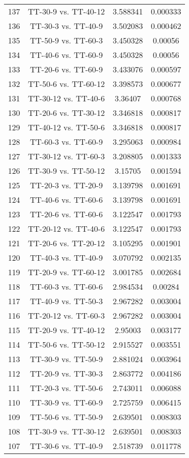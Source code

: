 \documentclass[a4paper,10pt]{article}
\begin{document}
\begin{landscape}
\begin{table}[!htp]
\begin{tabular}{cccc}
137&TT-30-9 vs. TT-40-12&3.588341&0.000333\\
136&TT-30-3 vs. TT-40-9&3.502083&0.000462\\
135&TT-50-9 vs. TT-60-3&3.450328&0.00056\\
134&TT-40-6 vs. TT-60-9&3.450328&0.00056\\
133&TT-20-6 vs. TT-60-9&3.433076&0.000597\\
132&TT-50-6 vs. TT-60-12&3.398573&0.000677\\
131&TT-30-12 vs. TT-40-6&3.36407&0.000768\\
130&TT-20-6 vs. TT-30-12&3.346818&0.000817\\
129&TT-40-12 vs. TT-50-6&3.346818&0.000817\\
128&TT-60-3 vs. TT-60-9&3.295063&0.000984\\
127&TT-30-12 vs. TT-60-3&3.208805&0.001333\\
126&TT-30-9 vs. TT-50-12&3.15705&0.001594\\
125&TT-20-3 vs. TT-20-9&3.139798&0.001691\\
124&TT-40-6 vs. TT-60-6&3.139798&0.001691\\
123&TT-20-6 vs. TT-60-6&3.122547&0.001793\\
122&TT-20-12 vs. TT-40-6&3.122547&0.001793\\
121&TT-20-6 vs. TT-20-12&3.105295&0.001901\\
120&TT-40-3 vs. TT-40-9&3.070792&0.002135\\
119&TT-20-9 vs. TT-60-12&3.001785&0.002684\\
118&TT-60-3 vs. TT-60-6&2.984534&0.00284\\
117&TT-40-9 vs. TT-50-3&2.967282&0.003004\\
116&TT-20-12 vs. TT-60-3&2.967282&0.003004\\
115&TT-20-9 vs. TT-40-12&2.95003&0.003177\\
114&TT-50-6 vs. TT-50-12&2.915527&0.003551\\
113&TT-30-9 vs. TT-50-9&2.881024&0.003964\\
112&TT-20-9 vs. TT-30-3&2.863772&0.004186\\
111&TT-20-3 vs. TT-50-6&2.743011&0.006088\\
110&TT-30-9 vs. TT-60-9&2.725759&0.006415\\
109&TT-50-6 vs. TT-50-9&2.639501&0.008303\\
108&TT-30-9 vs. TT-30-12&2.639501&0.008303\\
107&TT-30-6 vs. TT-40-9&2.518739&0.011778\\

\end{tabular}
\end{table}
\end{landscape}
\end{document}
